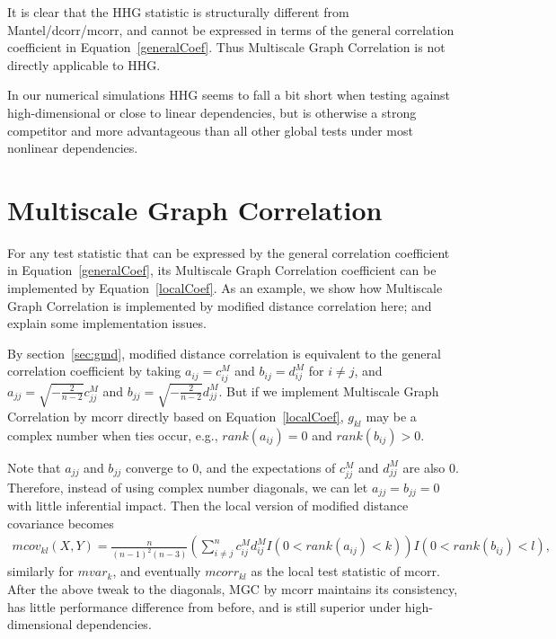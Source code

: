 \documentclass[11pt]{article}
\begin{document}
It is clear that the HHG statistic is structurally different from Mantel/dcorr/mcorr, and cannot be expressed in terms of the general correlation coefficient in Equation~\ref{generalCoef}. Thus Multiscale Graph Correlation is not directly applicable to HHG.

In our numerical simulations HHG seems to fall a bit short when testing against high-dimensional or close to linear dependencies, but is otherwise a strong competitor and more advantageous than all other global tests under most nonlinear dependencies. %

\section{Multiscale Graph Correlation}
\label{main2}

For any test statistic that can be expressed by the general correlation coefficient in Equation~\ref{generalCoef}, its Multiscale Graph Correlation coefficient can be implemented by Equation~\ref{localCoef}. As an example, we show how Multiscale Graph Correlation is implemented by modified distance correlation here; and explain some implementation issues.

By section~\ref{sec:gmd}, modified distance correlation is equivalent to the general correlation coefficient by taking $a_{ij}=c^{M}_{ij}$ and $b_{ij}=d^{M}_{ij}$ for $i \neq j$, and $a_{jj}=\sqrt{-\frac{2}{n-2}}c^{M}_{jj}$ and $b_{jj}=\sqrt{-\frac{2}{n-2}}d^{M}_{jj}$. But if we implement Multiscale Graph Correlation by mcorr directly based on Equation~\ref{localCoef}, $g_{kl}$ may be a complex number when ties occur, e.g., $rank(a_{ij})=0$ and $rank(b_{ij})>0$.

Note that $a_{jj}$ and $b_{jj}$ converge to $0$, and the expectations of $c^{M}_{jj}$ and $d^{M}_{jj}$ are also $0$. Therefore, instead of using complex number diagonals, we can let $a_{jj}=b_{jj}=0$ with little inferential impact. Then the local version of modified distance covariance becomes
\begin{align*}
mcov_{kl}(X,Y) = \frac{n}{(n-1)^2(n-3)}(\sum_{i \neq j}^{n}c^{M}_{ij}d^{M}_{ij}I(0<rank(a_{ij})<k))I(0<rank(b_{ij})<l),
\end{align*}
similarly for $mvar_{k}$, and eventually $mcorr_{kl}$ as the local test statistic of mcorr. After the above tweak to the diagonals, MGC by mcorr maintains its consistency, has little performance difference from before, and is still superior under high-dimensional dependencies.
\end{document}
